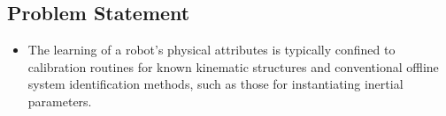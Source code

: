 \documentclass[12pt, a4paper]{article}
\begin{document}
\begin{enumerate}
%
%
%
%
%
%
%















\subsection*{Problem Statement}

\begin{itemize}
\item The learning of a robot's physical attributes is typically confined to calibration routines for known kinematic structures and conventional offline system identification methods, such as those for instantiating inertial parameters.


\end{itemize}
\end{enumerate}
\end{document}
